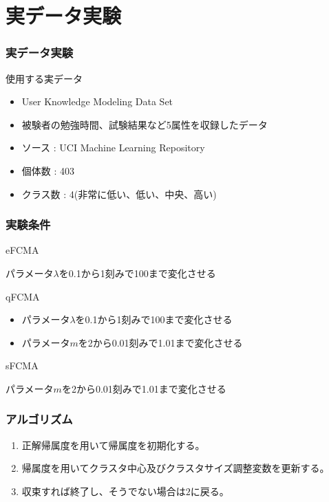 \documentclass[13pt,dvipdfmx]{beamer}
\begin{document}
\section{実データ実験}
\begin{frame}\frametitle{実データ実験}
  \begin{block}{使用する実データ}
    \begin{itemize}
     \item User Knowledge Modeling Data Set
     \item 被験者の勉強時間、試験結果など5属性を収録したデータ
     \item ソース : UCI  Machine Learning Repository
     \item 個体数 : 403
     \item クラス数 : 4(非常に低い、低い、中央、高い)
    \end{itemize}
  \end{block}
\end{frame}

\begin{frame}\frametitle{実験条件}
  \begin{block}{eFCMA}
    \begin{center}
      パラメータ$\lambda$を0.1から1刻みで100まで変化させる
    \end{center}
  \end{block}
  \begin{block}{qFCMA}
    \begin{itemize}
      \item パラメータ$\lambda$を0.1から1刻みで100まで変化させる
      \item パラメータ$m$を2から0.01刻みで1.01まで変化させる
    \end{itemize}
  \end{block}
  \begin{block}{sFCMA}
    \begin{center}
      パラメータ$m$を2から0.01刻みで1.01まで変化させる
    \end{center}
  \end{block}
\end{frame}

\begin{frame}\frametitle{アルゴリズム}
  \begin{enumerate}
  \item 正解帰属度を用いて帰属度を初期化する。
  \item 帰属度を用いてクラスタ中心及びクラスタサイズ調整変数を更新する。
  \item 収束すれば終了し、そうでない場合は$2$に戻る。
  \end{enumerate}
\end{frame}
\end{document}
